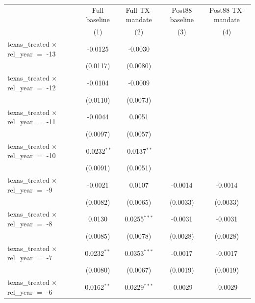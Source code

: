 
\begingroup
\centering
\begin{tabular}{lcccc}
   \toprule
                                                & Full baseline  & Full TX-mandate & Post88 baseline & Post88 TX-mandate \\   
                                                & (1)            & (2)             & (3)             & (4)\\  
   \midrule 
   texas\_treated $\times$ rel\_year $=$ -13    & -0.0125        & -0.0030         &                 &   \\   
                                                & (0.0117)       & (0.0080)        &                 &   \\   
   texas\_treated $\times$ rel\_year $=$ -12    & -0.0104        & -0.0009         &                 &   \\   
                                                & (0.0110)       & (0.0073)        &                 &   \\   
   texas\_treated $\times$ rel\_year $=$ -11    & -0.0044        & 0.0051          &                 &   \\   
                                                & (0.0097)       & (0.0057)        &                 &   \\   
   texas\_treated $\times$ rel\_year $=$ -10    & -0.0232$^{**}$ & -0.0137$^{**}$  &                 &   \\   
                                                & (0.0091)       & (0.0051)        &                 &   \\   
   texas\_treated $\times$ rel\_year $=$ -9     & -0.0021        & 0.0107          & -0.0014         & -0.0014\\   
                                                & (0.0082)       & (0.0065)        & (0.0033)        & (0.0033)\\   
   texas\_treated $\times$ rel\_year $=$ -8     & 0.0130         & 0.0255$^{***}$  & -0.0031         & -0.0031\\   
                                                & (0.0085)       & (0.0078)        & (0.0028)        & (0.0028)\\   
   texas\_treated $\times$ rel\_year $=$ -7     & 0.0232$^{**}$  & 0.0353$^{***}$  & -0.0017         & -0.0017\\   
                                                & (0.0080)       & (0.0067)        & (0.0019)        & (0.0019)\\   
   texas\_treated $\times$ rel\_year $=$ -6     & 0.0162$^{**}$  & 0.0229$^{***}$  & -0.0029         & -0.0029\\   

\end{tabular}
